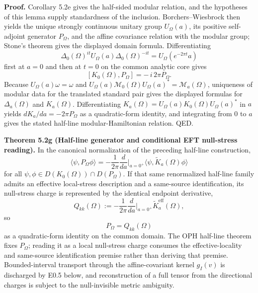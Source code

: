 \textbf{Proof.} Corollary 5.2e gives the half-sided modular relation, and the hypotheses of this lemma supply standardness of the inclusion. Borchers--Wiesbrock then yields the unique strongly continuous unitary group \(U_\Omega(a)\), its positive self-adjoint generator \(P_\Omega\), and the affine covariance relation with the modular group; Stone's theorem gives the displayed domain formula. Differentiating
\[
\Delta_0(\Omega)^{it}U_\Omega(a)\Delta_0(\Omega)^{-it}
=
U_\Omega(e^{-2\pi t}a)
\]
first at \(a=0\) and then at \(t=0\) on the common analytic core gives
\[
[K_0(\Omega),P_\Omega]=-\,i\,2\pi P_\Omega.
\]
Because \(U_\Omega(a)\omega=\omega\) and \(U_\Omega(a)\mathcal M_0(\Omega)U_\Omega(a)^*=\mathcal M_a(\Omega)\), uniqueness of modular data for the translated standard pair gives the displayed formulas for \(\Delta_a(\Omega)\) and \(K_a(\Omega)\). Differentiating \(K_a(\Omega)=U_\Omega(a)K_0(\Omega)U_\Omega(a)^*\) in \(a\) yields \(dK_a/da=-2\pi P_\Omega\) as a quadratic-form identity, and integrating from \(0\) to \(a\) gives the stated half-line modular-Hamiltonian relation. QED.

\textbf{Theorem 5.2g (Half-line generator and conditional EFT null-stress reading).} In the canonical normalization of the preceding half-line construction,
\[
\langle\psi,P_\Omega\phi\rangle
=
-\frac{1}{2\pi}\frac{d}{da}\Big|_{a=0^+}
\langle\psi,\widetilde K_a(\Omega)\phi\rangle
\]
for all \(\psi,\phi\in D(K_0(\Omega))\cap D(P_\Omega)\). If that same renormalized half-line family admits an effective local-stress description and a same-source identification, its null-stress charge is represented by the identical endpoint derivative,
\[
Q_{kk}(\Omega)
:=
-\frac{1}{2\pi}\frac{d}{da}\Big|_{a=0^+}\widetilde K^{\mathrm{eff}}_a(\Omega),
\]
so
\[
P_\Omega = Q_{kk}(\Omega)
\]
as a quadratic-form identity on the common domain. The OPH half-line theorem fixes \(P_\Omega\); reading it as a local null-stress charge consumes the effective-locality and same-source identification premise rather than deriving that premise. Bounded-interval transport through the affine-covariant kernel \(g_I(v)\) is discharged by E0.5 below, and reconstruction of a full tensor from the directional charges is subject to the null-invisible metric ambiguity.

